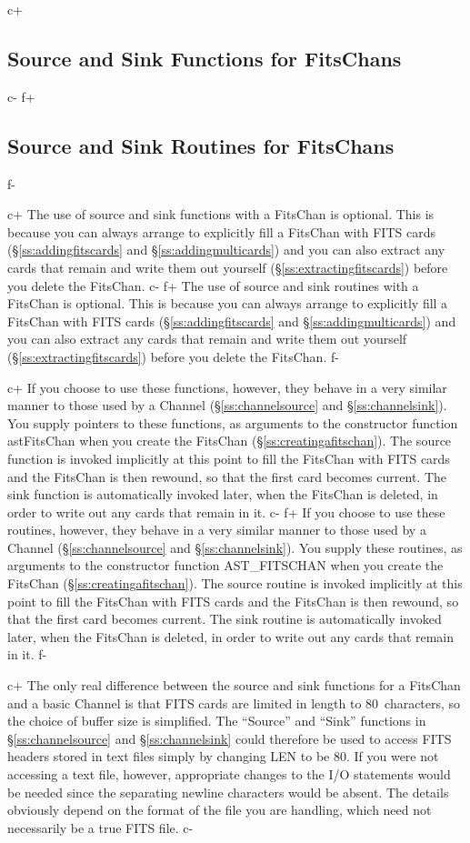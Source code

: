 \documentclass[twoside,11pt]{article}
\newcommand{\secref}[1]{\S\ref{#1}}
\newcommand{\secref}[1]{\ref{#1}}
\begin{document}
c+
\subsection{\label{ss:fitssourceandsink}Source and Sink Functions for FitsChans}
c-
f+
\subsection{\label{ss:fitssourceandsink}Source and Sink Routines for FitsChans}
f-

c+
The use of source and sink functions with a FitsChan is optional. This
is because you can always arrange to explicitly fill a FitsChan with
FITS cards (\secref{ss:addingfitscards} and \secref{ss:addingmulticards}) 
and you can also extract any
cards that remain and write them out yourself
(\secref{ss:extractingfitscards}) before you delete the FitsChan.
c-
f+
The use of source and sink routines with a FitsChan is optional. This
is because you can always arrange to explicitly fill a FitsChan with
FITS cards (\secref{ss:addingfitscards} and \secref{ss:addingmulticards}) 
and you can also extract any
cards that remain and write them out yourself
(\secref{ss:extractingfitscards}) before you delete the FitsChan.
f-

c+
If you choose to use these functions, however, they behave in a very
similar manner to those used by a Channel (\secref{ss:channelsource}
and \secref{ss:channelsink}). You supply pointers to these functions,
as arguments to the constructor function astFitsChan when you create
the FitsChan (\secref{ss:creatingafitschan}). The source function is
invoked implicitly at this point to fill the FitsChan with FITS cards
and the FitsChan is then rewound, so that the first card becomes
current. The sink function is automatically invoked later, when the
FitsChan is deleted, in order to write out any cards that remain in
it.
c-
f+
If you choose to use these routines, however, they behave in a very
similar manner to those used by a Channel (\secref{ss:channelsource}
and \secref{ss:channelsink}). You supply these routines, as arguments
to the constructor function AST\_FITSCHAN when you create the FitsChan
(\secref{ss:creatingafitschan}). The source routine is invoked
implicitly at this point to fill the FitsChan with FITS cards and the
FitsChan is then rewound, so that the first card becomes current. The
sink routine is automatically invoked later, when the FitsChan is
deleted, in order to write out any cards that remain in it.
f-

c+
The only real difference between the source and sink functions for a
FitsChan and a basic Channel is that FITS cards are limited in length
to 80~characters, so the choice of buffer size is simplified.  The
``Source'' and ``Sink'' functions in \secref{ss:channelsource} and
\secref{ss:channelsink} could therefore be used to access FITS headers
stored in text files simply by changing LEN to be 80.  If you were not
accessing a text file, however, appropriate changes to the I/O
statements would be needed since the separating newline characters
would be absent. The details obviously depend on the format of the
file you are handling, which need not necessarily be a true FITS file.
c-
\end{document}
